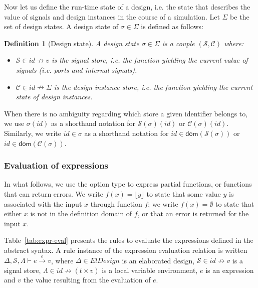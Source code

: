 \documentclass[pdflatex,sn-mathphys]{sn-jnl}%
\theoremstyle{thmstyleone}%
\theoremstyle{thmstyletwo}%
\theoremstyle{thmstylethree}%
\newtheorem{definition}{Definition}%
\begin{document}
Now let us define the run-time state of a design, i.e. the state that
describes the value of signals and design instances in the course of a
simulation. Let $\Sigma$ be the set of design states.  A design state
of $\sigma\in{}\Sigma$ is defined as follows:

\begin{definition}[Design state]
  \label{def:design-state}
  A design state $\sigma\in\Sigma$ is a couple
  $(\mathcal{S},\mathcal{C})$ where:
  \begin{itemize}[label=$-$]
  \item $\mathcal{S}\in{}id\nrightarrow{}v$ is the signal store,
    i.e. the function yielding the current value of signals
    (i.e. ports and internal signals).
  \item $\mathcal{C}\in{}id\nrightarrow{}\Sigma$ is the design
    instance store, i.e.  the function yielding the current state of
    design instances.
  \end{itemize}
\end{definition}

When there is no ambiguity regarding which store a given identifier
belongs to, we use $\sigma(id)$ as a shorthand notation for
$\mathcal{S}(\sigma)(id)$ or $\mathcal{C}(\sigma)(id)$.  Similarly, we
write $id\in\sigma$ as a shorthand notation for
$id\in\mathsf{dom}(\mathcal{S}(\sigma))$ or
$id\in\mathsf{dom}(\mathcal{C}(\sigma))$.

\subsubsection{Evaluation of expressions}
\label{subsubsec:expr-eval}

In what follows, we use the option type to express partial functions,
or functions that can return errors.  We write
$f(x)=\lfloor{}y\rfloor$ to state that some value $y$ is associated
with the input $x$ through function $f$; we write $f(x)=\emptyset$ to
state that either $x$ is not in the definition domain of $f$, or that
an error is returned for the input $x$.

Table~\ref{tab:expr-eval} presents the rules to evaluate the
expressions defined in the \hvhdl{} abstract syntax. A rule instance
of the expression evaluation relation is written
$\Delta,\mathcal{S},\Lambda\vdash{}e\xrightarrow{e}v$, where
$\Delta\in{}ElDesign$ is an elaborated design,
$\mathcal{S}\in{}id\nrightarrow{}v$ is a signal store,
$\Lambda\in{}id\nrightarrow(t\times{}v)$ is a local variable
environment, $e$ is an expression and $v$ the value resulting from the
evaluation of $e$.
\end{document}
